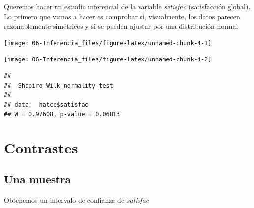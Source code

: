 \documentclass[]{book}
\newenvironment{Shaded}{\begin{snugshade}}{\end{snugshade}}
\newcommand{\KeywordTok}[1]{\textcolor[rgb]{0.13,0.29,0.53}{\textbf{#1}}}
\newcommand{\NormalTok}[1]{#1}
\newcommand{\OperatorTok}[1]{\textcolor[rgb]{0.81,0.36,0.00}{\textbf{#1}}}
\begin{document}
Queremos hacer un estudio inferencial de la variable \emph{satisfac} (satisfacción global). Lo primero
que vamos a hacer es comprobar si, visualmente, los datos parecen razonablemente
simétricos y si se pueden ajustar por una distribución normal

\begin{Shaded}
\end{Shaded}

\begin{center}\texttt{[image: 06-Inferencia\_files/figure-latex/unnamed-chunk-4-1]} \end{center}

\begin{Shaded}
\end{Shaded}

\begin{center}\texttt{[image: 06-Inferencia\_files/figure-latex/unnamed-chunk-4-2]} \end{center}

\begin{Shaded}
\end{Shaded}

\begin{verbatim}
## 
##  Shapiro-Wilk normality test
## 
## data:  hatco$satisfac
## W = 0.97608, p-value = 0.06813
\end{verbatim}

\hypertarget{contrastes}{%
\section{Contrastes}\label{contrastes}}

\hypertarget{una-muestra}{%
\subsection{Una muestra}\label{una-muestra}}

Obtenemos un intervalo de confianza de \emph{satisfac}
\end{document}

